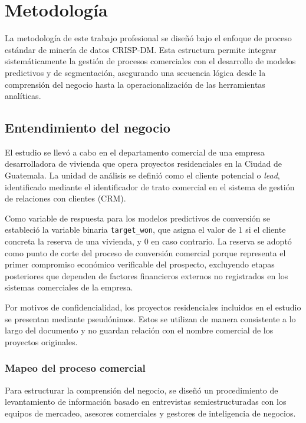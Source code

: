 %
\chapter{Metodología}

La metodología de este trabajo profesional se diseñó bajo el enfoque de proceso estándar de minería de datos CRISP-DM. Esta estructura permite integrar sistemáticamente la gestión de procesos comerciales con el desarrollo de modelos predictivos y de segmentación, asegurando una secuencia lógica desde la comprensión del negocio hasta la operacionalización de las herramientas analíticas.

\section{Entendimiento del negocio}
El estudio se llevó a cabo en el departamento comercial de una empresa desarrolladora de vivienda que opera proyectos residenciales en la Ciudad de Guatemala. La unidad de análisis se definió como el cliente potencial o \emph{lead}, identificado mediante el identificador de trato comercial en el sistema de gestión de relaciones con clientes (CRM). 

Como variable de respuesta para los modelos predictivos de conversión se estableció la variable binaria \texttt{target\_won}, que asigna el valor de $1$ si el cliente concreta la reserva de una vivienda, y $0$ en caso contrario. La reserva se adoptó como punto de corte del proceso de conversión comercial porque representa el primer compromiso económico verificable del prospecto, excluyendo etapas posteriores que dependen de factores financieros externos no registrados en los sistemas comerciales de la empresa.

Por motivos de confidencialidad, los proyectos residenciales incluidos en el estudio se presentan mediante pseudónimos. Estos se utilizan de manera consistente a lo largo del documento y no guardan relación con el nombre comercial de los proyectos originales.

\subsection{Mapeo del proceso comercial}
\label{sec:met-bpmn}
Para estructurar la comprensión del negocio, se diseñó un procedimiento de levantamiento de información basado en entrevistas semiestructuradas con los equipos de mercadeo, asesores comerciales y gestores de inteligencia de negocios. 

